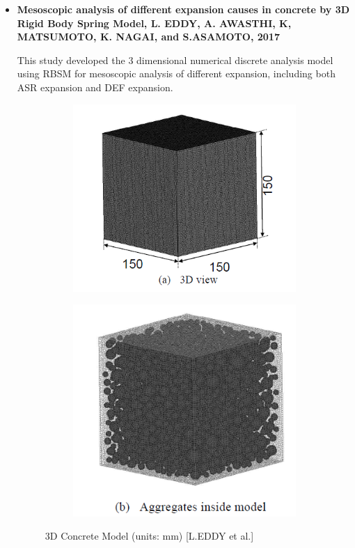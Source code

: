 \begin{itemize}
    \item
    \textbf{Mesoscopic analysis of different expansion causes in concrete by 3D Rigid Body Spring Model, L. EDDY, A. AWASTHI, K, MATSUMOTO, K. NAGAI, and S.ASAMOTO, 2017}

    This study developed the 3 dimensional numerical discrete analysis model using RBSM for mesoscopic analysis of different expansion, including both ASR expansion and DEF expansion.


    \begin{figure}[ht!]
    \centering
    \begin{subfigure}{.5\textwidth}
      \centering
      \includegraphics[width=.9\linewidth]{Files/Background/EDDY_model_1.png}
    \end{subfigure}%
    \begin{subfigure}{.5\textwidth}
      \centering
      \includegraphics[width=.75\linewidth]{Files/Background/EDDY_model_2.png}
    \end{subfigure}
    \caption{3D Concrete Model (units: mm) [L.EDDY et al.]}
    \label{fig:EDDY_model}
    \end{figure}


\end{itemize}
